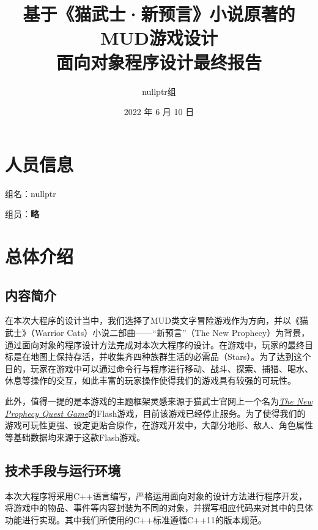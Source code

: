\documentclass[hyperref,UTF8,a4paper]{ctexart}
\title{基于《猫武士·新预言》小说原著的MUD游戏设计\\
\bigskip\large 面向对象程序设计最终报告}
\author{nullptr组}
\date{2022 年 6 月 10 日}
\begin{document}
\maketitle

\hypertarget{ux4ebaux5458ux4fe1ux606f}{%
\section{人员信息}\label{ux4ebaux5458ux4fe1ux606f}}

组名：nullptr

组员：\textbf{略}

\hypertarget{ux603bux4f53ux4ecbux7ecd}{%
\section{总体介绍}\label{ux603bux4f53ux4ecbux7ecd}}

\hypertarget{ux5185ux5bb9ux7b80ux4ecb}{%
\subsection{内容简介}\label{ux5185ux5bb9ux7b80ux4ecb}}

在本次大程序的设计当中，我们选择了MUD类文字冒险游戏作为方向，并以《猫武士》（Warrior
Cats）小说二部曲------``新预言''（The New
Prophecy）为背景，通过面向对象的程序设计方法完成对本次大程序的设计。在游戏中，玩家的最终目标是在地图上保持存活，并收集齐四种族群生活的必需品（Stars）。为了达到这个目的，玩家在游戏中可以通过命令行与程序进行移动、战斗、探索、捕猎、喝水、休息等操作的交互，如此丰富的玩家操作使得我们的游戏具有较强的可玩性。

此外，值得一提的是本游戏的主题框架灵感来源于猫武士官网上一个名为\href{https://web.archive.org/web/20161121090738/http://www.warriorcats.com/games-and-extras/games/the-new-prophecy-quest}{\emph{The
New Prophecy Quest
Game}}的Flash游戏，目前该游戏已经停止服务。为了使得我们的游戏可玩性更强、设定更贴合原作，在游戏开发中，大部分地形、敌人、角色属性等基础数据均来源于这款Flash游戏。

\hypertarget{ux6280ux672fux624bux6bb5ux4e0eux8fd0ux884cux73afux5883}{%
\subsection{技术手段与运行环境}\label{ux6280ux672fux624bux6bb5ux4e0eux8fd0ux884cux73afux5883}}

本次大程序将采用C++语言编写，严格运用面向对象的设计方法进行程序开发，将游戏中的物品、事件等内容封装为不同的对象，并撰写相应代码来对其中的具体功能进行实现。其中我们所使用的C++标准遵循C++11的版本规范。
\end{document}
